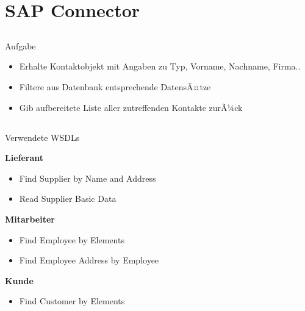 \documentclass[xcolor={usenames,dvipsnames}, compress, 10pt]{beamer}
\begin{document}


\section{SAP Connector}

\subsection*{}

\begin{frame}{Aufgabe}
\begin{center}

\begin{itemize}
\item Erhalte Kontaktobjekt mit Angaben zu Typ, Vorname, Nachname, Firma..
\item Filtere aus Datenbank entsprechende DatensÃ¤tze
\item Gib aufbereitete Liste aller zutreffenden Kontakte zurÃ¼ck
\end{itemize}

\end{center}
\end{frame}

\subsection*{}

\begin{frame}{Verwendete WSDLs}
\begin{center}

\textbf{Lieferant}
\begin{itemize}
\item Find Supplier by Name and Address
\item Read Supplier Basic Data 
\end{itemize}

\textbf{Mitarbeiter}
\begin{itemize}
\item Find Employee by Elements
\item Find Employee Address by Employee
\end{itemize}

\textbf{Kunde}
\begin{itemize}
\item Find Customer by Elements
\end{itemize}



\end{center}
\end{frame}
\end{document}
